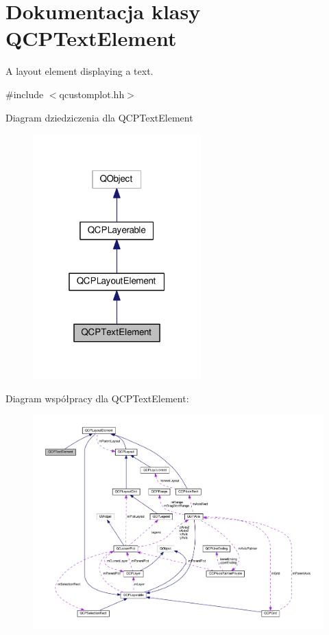 \hypertarget{class_q_c_p_text_element}{}\section{Dokumentacja klasy Q\+C\+P\+Text\+Element}
\label{class_q_c_p_text_element}


A layout element displaying a text.  




{\ttfamily \#include $<$qcustomplot.\+hh$>$}



Diagram dziedziczenia dla Q\+C\+P\+Text\+Element\nopagebreak
\begin{figure}[H]
\begin{center}
\leavevmode
\includegraphics[width=184pt]{class_q_c_p_text_element__inherit__graph}
\end{center}
\end{figure}


Diagram współpracy dla Q\+C\+P\+Text\+Element\+:\nopagebreak
\begin{figure}[H]
\begin{center}
\leavevmode
\includegraphics[width=350pt]{class_q_c_p_text_element__coll__graph}
\end{center}
\end{figure}
